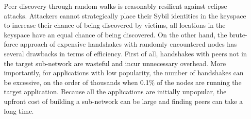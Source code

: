 Peer discovery through random walks is reasonably resilient against eclipse attacks. Attackers cannot strategically place their Sybil identities in the keyspace to increase their chance of being discovered by victims, \ie all locations in the keyspace have an equal chance of being discovered. 
On the other hand, the brute-force approach of expensive handshakes with randomly encountered nodes has several drawbacks in terms of efficiency. First of all, handshakes with peers not in the target sub-network are wasteful and incur unnecessary overhead. %
More importantly, for applications with low popularity, the number of handshakes can be excessive, \ie on the order of thousands when 0.1\% of the nodes are running the target application. Because all the applications are initially unpopular, the upfront cost of building a sub-network can be large and finding peers can take a long time. 
